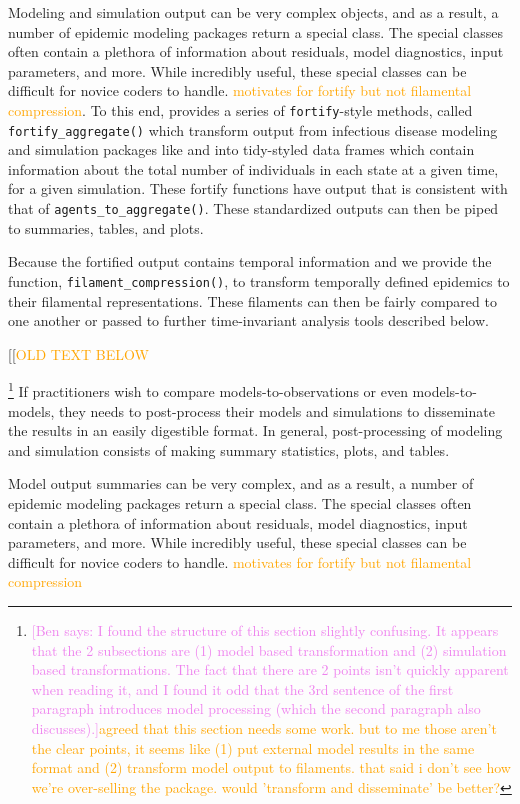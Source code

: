 \documentclass[
  shortnames]{jss}
\begin{document}
Modeling and simulation output can be very complex objects, and as a
result, a number of epidemic modeling  packages return a
special class. The special classes often contain a plethora of
information about residuals, model diagnostics, input parameters, and
more. While incredibly useful, these special classes can be difficult
for novice coders to handle.
\textcolor{orange}{motivates for fortify but not filamental compression}.
To this end,  provides a series of
\texttt{fortify}-style methods, called \texttt{fortify\_aggregate()}
which transform output from infectious disease modeling and simulation
packages like  and  into tidy-styled data frames
which contain information about the total number of individuals in each
state at a given time, for a given simulation. These fortify functions
have output that is consistent with that of
\texttt{agents\_to\_aggregate()}. These standardized outputs can then be
piped to summaries, tables, and plots.

Because the fortified output contains temporal information and we
provide the function, \texttt{filament\_compression()}, to transform
temporally defined epidemics to their filamental representations. These
filaments can then be fairly compared to one another or passed to
further time-invariant analysis tools described below.

{[}{[}\textcolor{orange}{OLD TEXT BELOW}

\footnote{\textcolor{violet}{[Ben says: I found the structure of this section slightly confusing. It appears that the 2 subsections are (1) model based transformation and (2) simulation based transformations. The fact that there are 2 points isn't quickly apparent when reading it, and I found it odd that the 3rd sentence of the first paragraph introduces model processing (which the second paragraph also discusses).]}\textcolor{orange}{agreed that this section needs some work.  but to me those aren't the clear points, it seems like (1) put external model results in the same format and (2) transform model output to filaments.  that said i don't see how we're over-selling the package.  would 'transform and disseminate' be better?}}
If practitioners wish to compare models-to-observations or even
models-to-models, they needs to post-process their models and
simulations to disseminate the results in an easily digestible format.
In general, post-processing of modeling and simulation consists of
making summary statistics, plots, and tables.

Model output summaries can be very complex, and as a result, a number of
epidemic modeling  packages return a special class. The
special classes often contain a plethora of information about residuals,
model diagnostics, input parameters, and more. While incredibly useful,
these special classes can be difficult for novice coders to handle.
\textcolor{orange}{motivates for fortify but not filamental compression}
\end{document}
